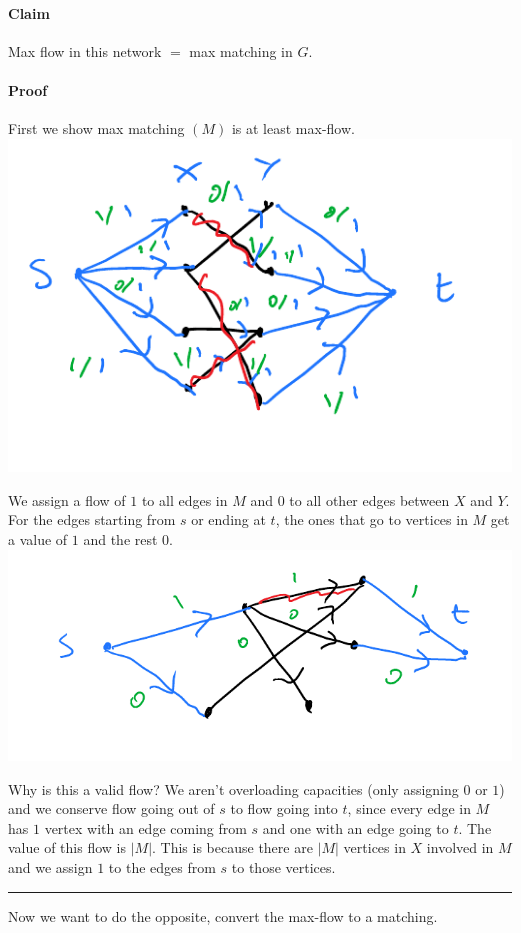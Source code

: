 \documentclass[12 pt]{article}
\begin{document}
        \paragraph{Claim} Max flow in this network $=$ max matching in
        $G$.
        \paragraph{Proof} First we show max matching $(M)$ is at least
        max\hbox{-}flow.
        \\ \includegraphics[width=.9\textwidth]{i51.pdf}
        
        We assign a flow of $1$ to all edges in $M$ and $0$ to all
        other edges between $X$ and $Y$. For the edges starting from
        $s$ or ending at $t$, the ones that go to vertices in $M$ get
        a value of $1$ and the rest $0$.
        \\ \includegraphics[width=.9\textwidth]{i52.pdf}

        Why is this a valid flow? We aren't overloading capacities
        (only assigning $0$ or $1$) and we conserve flow going out of
        $s$ to flow going into $t$, since every edge in $M$ has $1$
        vertex with an edge coming from $s$ and one with an edge going to $t$. The value of this
        flow is $|M|$. This is because there are $|M|$ vertices in $X$
        involved in $M$ and we assign $1$ to the edges from $s$ to
        those vertices.
        \\ \noindent \rule{\textwidth}{0.5pt}
        Now we want to do the opposite, convert the max\hbox{-}flow to
        a matching.
\end{document}
